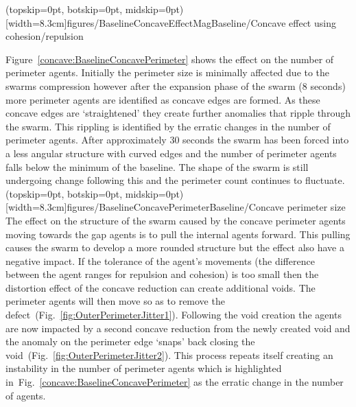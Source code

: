 \documentclass{ieeeaccess}
\begin{document}
\Figure[t!](topskip=0pt, botskip=0pt, midskip=0pt)[width=8.3cm]{figures/BaselineConcaveEffectMag}{Baseline/Concave effect using cohesion/repulsion\label{concave:BaselineConcaveEffectMag}}

Figure~\ref{concave:BaselineConcavePerimeter} shows the effect on the number of perimeter agents. Initially the perimeter size is minimally affected due to the swarms compression however after the expansion phase of the swarm (8 seconds) more perimeter agents are identified as concave edges are formed. As these concave edges are `straightened' they create further anomalies that ripple through the swarm. This rippling is identified by the erratic changes in the number of perimeter agents. After approximately 30 seconds the swarm has been forced into a less angular structure with curved edges and the number of perimeter agents falls below the minimum of the baseline. The shape of the swarm is still undergoing change following this and the perimeter count continues to fluctuate.
\Figure[t!](topskip=0pt, botskip=0pt, midskip=0pt)[width=8.3cm]{figures/BaselineConcavePerimeter}{Baseline/Concave perimeter size\label{concave:BaselineConcavePerimeter}}
The effect on the structure of the swarm caused by the concave perimeter agents moving towards the gap agents is to pull the internal agents forward. This pulling causes the swarm to develop a more rounded structure but the effect also have a negative impact. If the tolerance of the agent's movements (the difference between the agent ranges for repulsion and cohesion) is too small then the distortion effect of the concave reduction can create additional voids. The perimeter agents will then move so as to remove the defect~(Fig.~\ref{fig:OuterPerimeterJitter1}). Following the void creation the agents are now impacted by a second concave reduction from the newly created void and the anomaly on the perimeter edge `snaps' back closing the void~(Fig.~\ref{fig:OuterPerimeterJitter2}). This process repeats itself creating an instability in the number of perimeter agents which is highlighted in~Fig.~\ref{concave:BaselineConcavePerimeter} as the erratic change in the number of agents. 
\end{document}
